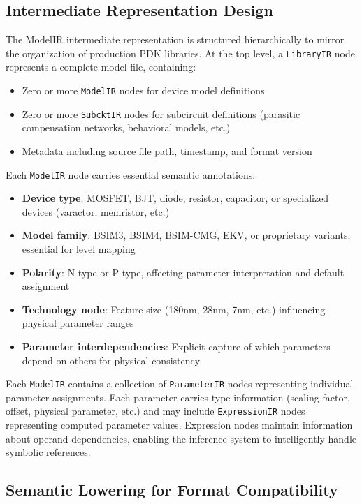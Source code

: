 \documentclass[10pt,twocolumn]{article}
\begin{document}
\subsection{Intermediate Representation Design}

The ModelIR intermediate representation is structured hierarchically to mirror the organization of production PDK libraries. At the top level, a \texttt{LibraryIR} node represents a complete model file, containing:
\begin{itemize}
\item Zero or more \texttt{ModelIR} nodes for device model definitions
\item Zero or more \texttt{SubcktIR} nodes for subcircuit definitions (parasitic compensation networks, behavioral models, etc.)
\item Metadata including source file path, timestamp, and format version
\end{itemize}

Each \texttt{ModelIR} node carries essential semantic annotations:
\begin{itemize}
\item \textbf{Device type}: MOSFET, BJT, diode, resistor, capacitor, or specialized devices (varactor, memristor, etc.)
\item \textbf{Model family}: BSIM3, BSIM4, BSIM-CMG, EKV, or proprietary variants, essential for level mapping
\item \textbf{Polarity}: N-type or P-type, affecting parameter interpretation and default assignment
\item \textbf{Technology node}: Feature size (180nm, 28nm, 7nm, etc.) influencing physical parameter ranges
\item \textbf{Parameter interdependencies}: Explicit capture of which parameters depend on others for physical consistency
\end{itemize}

Each \texttt{ModelIR} contains a collection of \texttt{ParameterIR} nodes representing individual parameter assignments. Each parameter carries type information (scaling factor, offset, physical parameter, etc.) and may include \texttt{ExpressionIR} nodes representing computed parameter values. Expression nodes maintain information about operand dependencies, enabling the inference system to intelligently handle symbolic references.

\subsection{Semantic Lowering for Format Compatibility}
\end{document}
